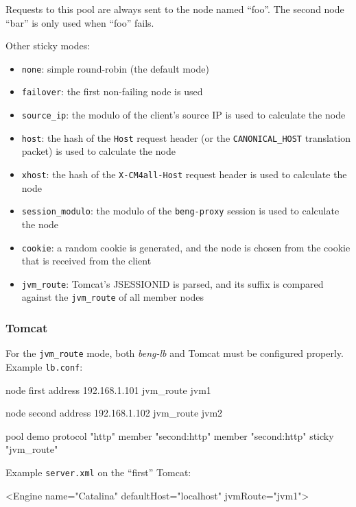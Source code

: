\documentclass[a4paper,12pt]{article}
\begin{document}
Requests to this pool are always sent to the node named ``foo''.  The
second node ``bar'' is only used when ``foo'' fails.

Other sticky modes:

\begin{itemize}
\item \texttt{none}: simple round-robin (the default mode)
\item \texttt{failover}: the first non-failing node is used
\item \verb|source_ip|: the modulo of the client's source IP is used
  to calculate the node
\item \verb|host|: the hash of the \texttt{Host} request header (or
  the \verb|CANONICAL_HOST| translation packet) is used to calculate
  the node
\item \verb|xhost|: the hash of the \texttt{X-CM4all-Host} request
  header is used to calculate the node
\item \texttt{session\_modulo}: the modulo of the \texttt{beng-proxy}
  session is used to calculate the node
\item \texttt{cookie}: a random cookie is generated, and the node is
  chosen from the cookie that is received from the client
\item \verb|jvm_route|: Tomcat's JSESSIONID is parsed, and its suffix
  is compared against the \verb|jvm_route| of all member nodes
\end{itemize}

\subsubsection{Tomcat}

For the \verb|jvm_route| mode, both \emph{beng-lb} and Tomcat must be
configured properly.  Example \texttt{lb.conf}:

\begin{verbatim*}
node first {
   address 192.168.1.101
   jvm_route jvm1
}

node second {
   address 192.168.1.102
   jvm_route jvm2
}

pool demo {
  protocol "http"
  member "second:http"
  member "second:http"
  sticky "jvm_route"
}
\end{verbatim*}

Example \texttt{server.xml} on the ``first'' Tomcat:

\begin{verbatim*}
<Engine name="Catalina" defaultHost="localhost" jvmRoute="jvm1">
\end{verbatim*}
\end{document}
